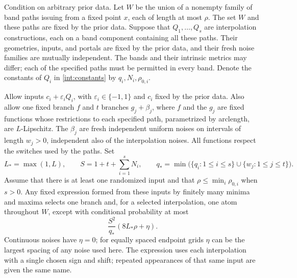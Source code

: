 \begin{corollary}\label{int:comparisons}
Condition on arbitrary prior data. Let $W$ be the union of a nonempty
family of band paths issuing from a fixed point $x$, each of length at
most $\rho$. The set $W$ and these paths are fixed by the prior data.
Suppose that $Q_1,\ldots,Q_s$ are interpolation constructions, each
on a band component containing all these paths. Their geometries,
inputs, and portals are fixed by the prior data, and their fresh noise
families are mutually independent. The bands and their intrinsic metrics
may differ; each of the specified paths must be permitted in every band.
Denote the constants of $Q_i$ in \eqref{int:constants} by
$q_i,N_i,\rho_{0,i}$.

Allow inputs $c_i+\varepsilon_iQ_i$, with
$\varepsilon_i\in\{-1,1\}$ and $c_i$ fixed by the prior data.
Also allow one fixed branch $f$ and $t$ branches $g_j+\beta_j$,
where $f$ and the $g_j$ are fixed functions whose restrictions to each
specified path, parametrized by arclength, are $L$-Lipschitz. The
$\beta_j$ are fresh independent uniform noises on intervals of length
$w_j>0$, independent also of the interpolation noises. All functions respect the switches used by the paths.
Set
\[
 L_* =\max(1,L),\qquad
 S=1+t+\sum_{i=1}^sN_i,\qquad
 q_* =\min\bigl(\{q_i:1\le i\le s\}\cup
                         \{w_j:1\le j\le t\}\bigr).
\]
Assume that there is at least one randomized input and that
$\rho\le\min_i\rho_{0,i}$ when $s>0$. Any fixed expression formed
from these inputs by finitely many minima and maxima selects one
branch and, for a selected interpolation, one atom throughout $W$,
except with conditional probability at most
\begin{equation}\label{int:comparison-probability}
 \frac{S^2}{q_*}(8L_*\rho+\eta).
\end{equation}
Continuous noises have $\eta=0$; for equally spaced endpoint grids
$\eta$ can be the largest spacing of any noise used here. The
expression uses each interpolation with a single chosen sign and
shift; repeated appearances of that same input are given the same
name.
\end{corollary}


